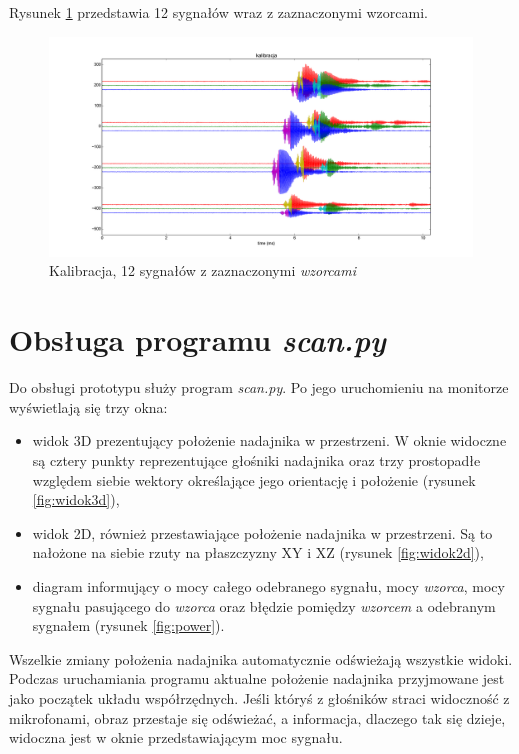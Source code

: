 Rysunek \ref{fig:kalibracja_12x} przedstawia 12 sygnałów wraz z zaznaczonymi wzorcami.


 \begin{figure}[h!]
    \centering
    \includegraphics[width=1.12\textwidth, trim= 46mm 0mm 0mm 0mm,clip]{kalibracja_12x}
    \caption{Kalibracja, 12 sygnałów z zaznaczonymi \textit{wzorcami}}
    \label{fig:kalibracja_12x}
\end{figure}

\newpage

\section{Obsługa programu \textit{scan.py}}

Do obsługi prototypu służy program \textit{scan.py}. Po jego uruchomieniu 
na monitorze wyświetlają się trzy okna: 
\begin{itemize}
 \item widok 3D prezentujący położenie nadajnika w przestrzeni. W oknie widoczne są  
 cztery punkty reprezentujące głośniki nadajnika oraz trzy prostopadłe względem siebie wektory określające 
jego orientację i położenie (rysunek \ref{fig:widok3d}),
 \item widok 2D, również przestawiające położenie nadajnika w przestrzeni. 
 Są to nałożone na siebie rzuty na płaszczyzny XY i XZ
 (rysunek \ref{fig:widok2d}),
 \item diagram informujący o mocy całego odebranego sygnału, mocy \textit{wzorca}, mocy sygnału pasującego do \textit{wzorca} 
 oraz błędzie pomiędzy \textit{wzorcem} a odebranym sygnałem (rysunek \ref{fig:power}).
\end{itemize}

Wszelkie zmiany położenia nadajnika automatycznie odświeżają wszystkie widoki. 
Podczas uruchamiania programu aktualne położenie nadajnika przyjmowane 
jest jako początek układu współrzędnych.
Jeśli któryś z głośników straci widoczność z mikrofonami, obraz przestaje się odświeżać, a informacja, dlaczego tak
się dzieje, widoczna jest w oknie przedstawiającym moc sygnału.




